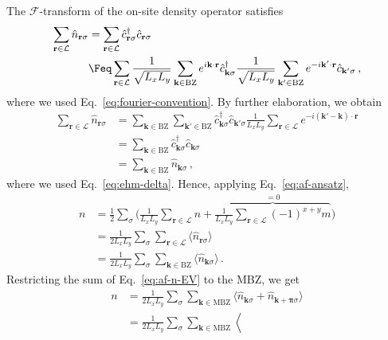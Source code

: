 \begin{tabproof}
	The $\mathcal{F}$-transform of the on-site density operator satisfies
	\begin{align}
		\sum_{\mathbf{r}\in\mathcal{L}} \hat n_{\mathbf{r}\sigma} &= \sum_{\mathbf{r}\in\mathcal{L}} \hat c_{\mathbf{r}\sigma}^\dagger \hat c_{\mathbf{r}\sigma} \nonumber \\
		&\Feq \sum_{\mathbf{r}\in\mathcal{L}}
		\frac{1}{\sqrt{L_x L_y}} \sum_{\mathbf{k} \in \mathrm{BZ}} e^{i \mathbf{k} \cdot \mathbf{r}} \hat c_{\mathbf{k}\sigma}^\dagger \frac{1}{\sqrt{L_x L_y}} \sum_{\mathbf{k}' \in \mathrm{BZ}} e^{-i \mathbf{k}' \cdot \mathbf{r}} \hat c_{\mathbf{k}'\sigma} \, , \label{eq:af-<n>-not0-int1}
	\end{align}
	where we used Eq.~\eqref{eq:fourier-convention}. By further elaboration, we obtain
	\begin{align}
		\sum_{\mathbf{r}\in\mathcal{L}} \hat n_{\mathbf{r}\sigma} &=\sum_{\mathbf{k} \in \mathrm{BZ}} \sum_{\mathbf{k}' \in \mathrm{BZ}} \hat c_{\mathbf{k}\sigma}^\dagger \hat c_{\mathbf{k}'\sigma} \frac{1}{L_x L_y} \sum_{\mathbf{r}\in\mathcal{L}} e^{-i (\mathbf{k}' - \mathbf{k}) \cdot \mathbf{r}} \nonumber \\
		&= \sum_{\mathbf{k} \in \mathrm{BZ}} \hat c_{\mathbf{k}\sigma}^\dagger \hat c_{\mathbf{k}\sigma} \nonumber \\
		&= \sum_{\mathbf{k} \in \mathrm{BZ}} \hat n_{\mathbf{k}\sigma} \, , \label{eq:af-<n>-not0}
	\end{align}
	where we used Eq.~\eqref{eq:ehm-delta}. Hence, applying Eq.~\eqref{eq:af-ansatz},
	\begin{align}
		n &= \frac{1}{2} \sum_\sigma \Bigg(
		\frac{1}{L_x L_y} \sum_{\mathbf{r}\in\mathcal{L}} n + \overbrace{\frac{1}{L_x L_y} \sum_{\mathbf{r}\in\mathcal{L}} (-1)^{x+y} m}^{=0}
		\Bigg) \nonumber \\
		&= \frac{1}{2L_x L_y} \sum_\sigma \sum_{\mathbf{r}\in\mathcal{L}} \langle \hat n_{\mathbf{r}\sigma} \rangle \nonumber \\
		&= \frac{1}{2L_x L_y} \sum_\sigma \sum_{\mathbf{k} \in \mathrm{BZ}} \langle \hat n_{\mathbf{k}\sigma} \rangle \, . \label{eq:af-n-EV}
	\end{align}
	Restricting the sum of Eq.~\eqref{eq:af-n-EV} to the MBZ, we get
	\begin{align}
		n &= \frac{1}{2L_x L_y} \sum_\sigma \sum_{\mathbf{k} \in \mathrm{MBZ}} \langle 
		\hat n_{\mathbf{k}\sigma} + \hat n_{\mathbf{k}+\bm{\pi}\sigma}
		\rangle \nonumber \\
		&= \frac{1}{2L_x L_y} \sum_\sigma \sum_{\mathbf{k} \in \mathrm{MBZ}} \left\langle 

\end{align}
\end{tabproof}

